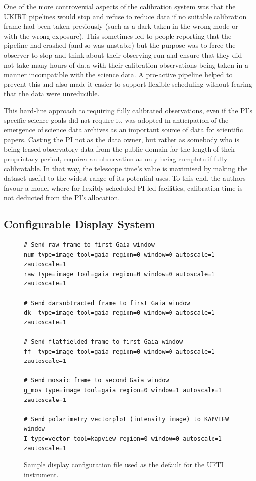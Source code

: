 \documentclass[final,authoryear,5p,times,twocolumn]{elsarticle}
\begin{document}
One of the more controversial aspects of the calibration system was
that the UKIRT pipelines would stop and refuse to reduce data if no
suitable calibration frame had been taken previously (such as a dark
taken in the wrong mode or with the wrong exposure). This sometimes
led to people reporting that the pipeline had crashed (and so was
unstable) but the purpose was to force the observer to stop and think
about their observing run and ensure that they did not take many hours
of data with their calibration observations being taken in a manner
incompatible with the science data. A pro-active pipeline helped to
prevent this and also made it easier to support flexible scheduling
\citep{2002ASPC..281..488E,2004SPIE.5493...24A} without fearing that
the data were unreducible.

This hard-line approach to requiring fully calibrated observations,
even if the PI's specific science goals did not require it, was
adopted in anticipation of the emergence of science data archives as
an important source of data for scientific papers. Casting the PI not
as the data owner, but rather as somebody who is being leased
observatory data from the public domain for the length of their
proprietary period, requires an observation as only being complete if
fully calibratable. In that way, the telescope time's value is
maximised by making the dataset useful to the widest range of its
potential uses. To this end, the authors favour a model where for
flexibly-scheduled PI-led facilities, calibration time is not deducted
from the PI's allocation.

\subsection{Configurable Display System}

\begin{figure}
{\small
\begin{verbatim}
# Send raw frame to first Gaia window
num type=image tool=gaia region=0 window=0 autoscale=1 zautoscale=1
raw type=image tool=gaia region=0 window=0 autoscale=1 zautoscale=1

# Send darsubtracted frame to first Gaia window
dk  type=image tool=gaia region=0 window=0 autoscale=1 zautoscale=1

# Send flatfielded frame to first Gaia window
ff  type=image tool=gaia region=0 window=0 autoscale=1 zautoscale=1

# Send mosaic frame to second Gaia window
g_mos type=image tool=gaia region=0 window=1 autoscale=1 zautoscale=1

# Send polarimetry vectorplot (intensity image) to KAPVIEW window
I type=vector tool=kapview region=0 window=0 autoscale=1 zautoscale=1
\end{verbatim}
}
\caption{Sample display configuration file used as the default for the
  UFTI instrument.}
\label{fig:disp}
\end{figure}
\end{document}
